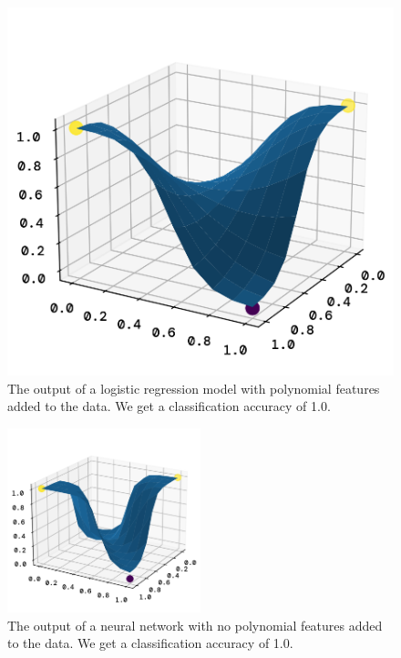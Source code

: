 \documentclass[twoside,11pt]{report}
\begin{document}
\begin{figure}[h]
\begin{minipage}{0.5\textwidth - 1mm}
\begin{center}
                \includegraphics[width=\textwidth]{../runsAndFigures/xor_poly.png}
                \caption{
                    The output of a logistic regression model with polynomial features added to the data.
                    We get a classification accuracy of 1.0. 
                }\label{fig:xor_poly}
            \end{center}
        \end{minipage}
    \end{figure}



    \begin{figure}[!h]
        \begin{center}
            \includegraphics[width=0.5\textwidth]{../runsAndFigures/xor_nn.png}
        \end{center}
        \caption{
            The output of a neural network with no polynomial features added to the data.
            We get a classification accuracy of 1.0. 
        }\label{fig:xor_nn}
    \end{figure}
\end{document}
